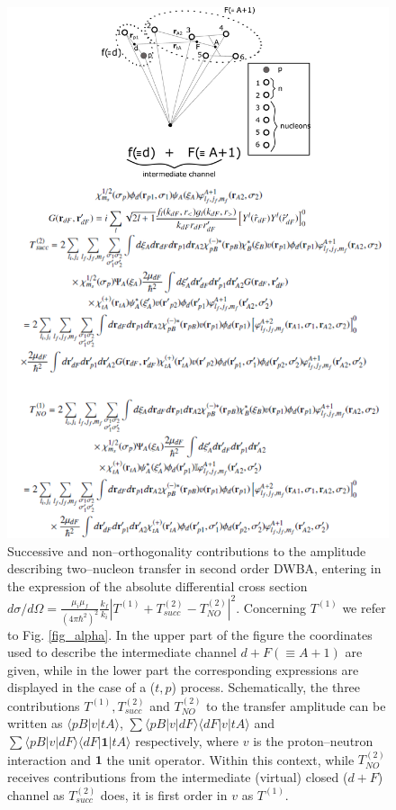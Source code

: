 \begin{figure}
\centerline{\includegraphics*[width=\textwidth,angle=0]{nutshell/figs/fig_beta.pdf}}
\caption{Successive and non--orthogonality contributions to the  amplitude describing two--nucleon transfer in second order DWBA, entering in the expression of the absolute differential cross section $d\sigma/d\Omega=\tfrac{\mu_i\mu_f}{(4\pi\hbar^2)^2}\tfrac{k_f}{k_i}\left|T^{(1)}+T_{succ}^{(2)}-T^{(2)}_{NO}\right|^2$. Concerning $T^{(1)}$ we refer to Fig. \ref{fig_alpha}. In the upper part of the figure the coordinates used to describe the intermediate channel $d+F(\equiv A+1)$ are given, while in the lower part the corresponding expressions are displayed \citep{Potel:13b} in the case of a ($t,p$) process. Schematically, the three contributions $T^{(1)}, T^{(2)}_{succ}$ and $T^{(2)}_{NO}$ to the transfer amplitude can be written as $\langle pB|v|tA\rangle$, $\sum \langle pB|v|dF\rangle\langle dF|v|tA\rangle$ and $\sum \langle pB|v|dF\rangle\langle dF| \mathbf{1}|tA\rangle$ respectively, where $v$ is the proton--neutron interaction and $\mathbf 1$ the unit operator. Within this context, while $T^{(2)}_{NO}$ receives contributions from the intermediate (virtual) closed ($d+F$) channel as $T^{(2)}_{succ}$ does, it is first order in $v$ as $T^{(1)}$.}\label{fig_beta}
\end{figure}

